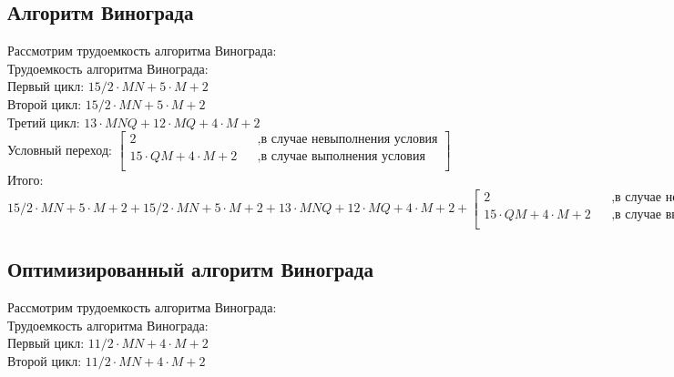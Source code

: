 \documentclass[12pt]{report}
\begin{document}
\subsection{Алгоритм Винограда}

Рассмотрим трудоемкость алгоритма Винограда:\\

Трудоемкость алгоритма Винограда:\\

Первый цикл: $15/2 \cdot M  N + 5 \cdot M + 2$ \\

Второй цикл: $15/2 \cdot M  N + 5 \cdot M + 2$\\

Третий цикл: $13 \cdot M  N Q + 12 \cdot M Q + 4 \cdot M + 2$\\

Условный переход: $\begin{bmatrix}
             2    &&, \text{в случае невыполнения условия}\\
             15 \cdot QM + 4 \cdot M + 2 &&, \text{в случае выполнения условия}\\
           \end{bmatrix} $ \\

Итого: $15/2 \cdot M  N + 5 \cdot M + 2 + 15/2 \cdot M  N + 5 \cdot M + 2 + 13 \cdot M  N Q + 12 \cdot M Q + 4 \cdot M + 2 +
       \begin{bmatrix}
             2    &&, \text{в случае невыполнения условия}\\
             15 \cdot QM + 4 \cdot M + 2 &&, \text{в случае выполнения условия}\\
           \end{bmatrix} $ \\

\subsection{Оптимизированный алгоритм Винограда}

Рассмотрим трудоемкость алгоритма Винограда:\\

Трудоемкость алгоритма Винограда:\\

Первый цикл: $11/2 \cdot M  N + 4 \cdot M + 2$ \\

Второй цикл: $11/2 \cdot M  N + 4 \cdot M + 2$\\
\end{document}
